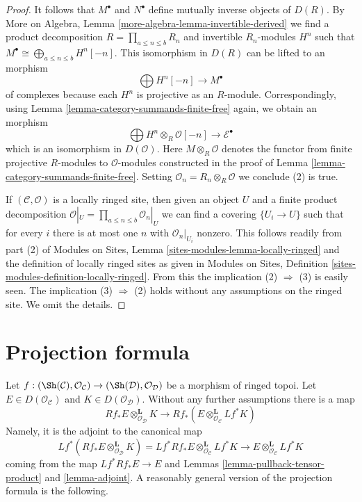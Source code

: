\begin{proof}
It follows that $M^\bullet$ and $N^\bullet$ define
mutually inverse objects of $D(R)$. By
More on Algebra, Lemma \ref{more-algebra-lemma-invertible-derived}
we find a product decomposition $R = \prod_{a \leq n \leq b} R_n$
and invertible $R_n$-modules $H^n$ such
that $M^\bullet \cong \bigoplus_{a \leq n \leq b} H^n[-n]$.
This isomorphism in $D(R)$ can be lifted to an morphism
$$
\bigoplus H^n[-n] \longrightarrow M^\bullet
$$
of complexes because each $H^n$ is projective as an $R$-module.
Correspondingly, using Lemma \ref{lemma-category-summands-finite-free} again,
we obtain an morphism
$$
\bigoplus H^n \otimes_R \mathcal{O}[-n] \to \mathcal{E}^\bullet
$$
which is an isomorphism in $D(\mathcal{O})$. Here $M \otimes_R \mathcal{O}$
denotes the functor from finite projective $R$-modules to $\mathcal{O}$-modules
constructed in the proof of Lemma \ref{lemma-category-summands-finite-free}.
Setting $\mathcal{O}_n = R_n \otimes_R \mathcal{O}$ we conclude
(2) is true.

\medskip\noindent
If $(\mathcal{C}, \mathcal{O})$ is a locally ringed site,
then given an object $U$ and a finite product decomposition
$\mathcal{O}|_U = \prod_{a \leq n \leq b} \mathcal{O}_n|_U$
we can find a covering $\{U_i \to U\}$ such that for every
$i$ there is at most one $n$ with $\mathcal{O}_n|_{U_i}$ nonzero.
This follows readily from part (2) of
Modules on Sites, Lemma \ref{sites-modules-lemma-locally-ringed}
and the definition of locally ringed sites as given in
Modules on Sites, Definition \ref{sites-modules-definition-locally-ringed}.
From this the implication (2) $\Rightarrow$ (3) is easily seen.
The implication (3) $\Rightarrow$ (2) holds without any assumptions
on the ringed site. We omit the details.
\end{proof}










\section{Projection formula}
\label{section-projection-formula}

\noindent
Let $f : (\Sh(\mathcal{C}), \mathcal{O}_\mathcal{C}) \to
(\Sh(\mathcal{D}), \mathcal{O}_\mathcal{D})$ be a morphism of ringed topoi.
Let $E \in D(\mathcal{O}_\mathcal{C})$ and $K \in D(\mathcal{O}_\mathcal{D})$.
Without any further assumptions there is a map
\begin{equation}
\label{equation-projection-formula-map}
Rf_*E \otimes^\mathbf{L}_{\mathcal{O}_\mathcal{D}} K
\longrightarrow
Rf_*(E \otimes^\mathbf{L}_{\mathcal{O}_\mathcal{C}} Lf^*K)
\end{equation}
Namely, it is the adjoint to the canonical map
$$
Lf^*(Rf_*E \otimes^\mathbf{L}_{\mathcal{O}_\mathcal{D}} K) =
Lf^*Rf_*E \otimes^\mathbf{L}_{\mathcal{O}_\mathcal{C}} Lf^*K
\longrightarrow
E \otimes^\mathbf{L}_{\mathcal{O}_\mathcal{C}} Lf^*K
$$
coming from the map $Lf^*Rf_*E \to E$ and Lemmas
\ref{lemma-pullback-tensor-product} and \ref{lemma-adjoint}.
A reasonably general version of the projection formula is the following.

